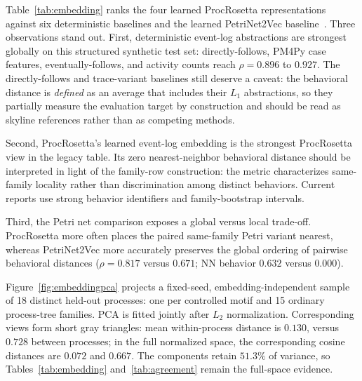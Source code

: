 \documentclass[manuscript,screen,nonacm]{acmart}
\begin{document}
Table~\ref{tab:embedding} ranks the four learned ProcRosetta representations against six deterministic baselines and the learned PetriNet2Vec baseline~\cite{Colonna2024}. Three observations stand out. First, deterministic event-log abstractions are strongest globally on this structured synthetic test set: directly-follows, PM4Py case features, eventually-follows, and activity counts reach $\rho = 0.896$ to $0.927$. The directly-follows and trace-variant baselines still deserve a caveat: the behavioral distance is \emph{defined} as an average that includes their $L_1$ abstractions, so they partially measure the evaluation target by construction and should be read as skyline references rather than as competing methods.

Second, ProcRosetta's learned event-log embedding is the strongest ProcRosetta view in the legacy table. Its zero nearest-neighbor behavioral distance should be interpreted in light of the family-row construction: the metric characterizes same-family locality rather than discrimination among distinct behaviors. Current reports use strong behavior identifiers and family-bootstrap intervals.

Third, the Petri net comparison exposes a global versus local trade-off. ProcRosetta more often places the paired same-family Petri variant nearest, whereas PetriNet2Vec more accurately preserves the global ordering of pairwise behavioral distances ($\rho = 0.817$ versus $0.671$; NN behavior $0.632$ versus $0.000$).

Figure~\ref{fig:embeddingpca} projects a fixed-seed, embedding-independent sample of 18 distinct held-out processes: one per controlled motif and 15 ordinary process-tree families. PCA is fitted jointly after $L_2$ normalization. Corresponding views form short gray triangles: mean within-process distance is $0.130$, versus $0.728$ between processes; in the full normalized space, the corresponding cosine distances are $0.072$ and $0.667$. The components retain $51.3\%$ of variance, so Tables~\ref{tab:embedding} and~\ref{tab:agreement} remain the full-space evidence.
\end{document}
